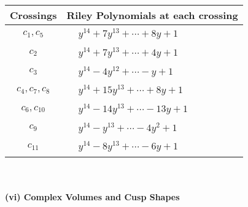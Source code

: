 \documentclass[1p]{elsarticle_modified}
\theoremstyle{definition}
\begin{document}
\begin{tabular}{m{50pt}|m{274pt}}
Crossings & \hspace{64pt}Riley Polynomials at each crossing \\
\hline $$\begin{aligned}c_{1},c_{5}\end{aligned}$$&$\begin{aligned}
&y^{14}+7 y^{13}+\cdots+8 y+1
\end{aligned}$\\
\hline $$\begin{aligned}c_{2}\end{aligned}$$&$\begin{aligned}
&y^{14}+7 y^{13}+\cdots+4 y+1
\end{aligned}$\\
\hline $$\begin{aligned}c_{3}\end{aligned}$$&$\begin{aligned}
&y^{14}-4 y^{12}+\cdots- y+1
\end{aligned}$\\
\hline $$\begin{aligned}c_{4},c_{7},c_{8}\end{aligned}$$&$\begin{aligned}
&y^{14}+15 y^{13}+\cdots+8 y+1
\end{aligned}$\\
\hline $$\begin{aligned}c_{6},c_{10}\end{aligned}$$&$\begin{aligned}
&y^{14}-14 y^{13}+\cdots-13 y+1
\end{aligned}$\\
\hline $$\begin{aligned}c_{9}\end{aligned}$$&$\begin{aligned}
&y^{14}- y^{13}+\cdots-4 y^2+1
\end{aligned}$\\
\hline $$\begin{aligned}c_{11}\end{aligned}$$&$\begin{aligned}
&y^{14}-8 y^{13}+\cdots-6 y+1
\end{aligned}$\\
\hline
\end{tabular}\\~\\
\newpage\flushleft \textbf{(vi) Complex Volumes and Cusp Shapes}
\end{document}
